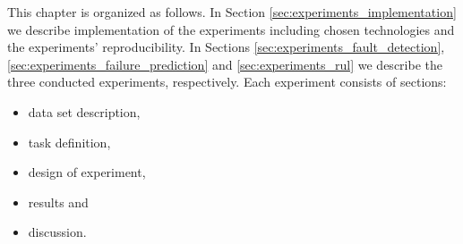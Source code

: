 This chapter is organized as follows.
In Section \ref{sec:experiments_implementation} we describe implementation of the experiments including chosen technologies and the experiments' reproducibility.
In Sections \ref{sec:experiments_fault_detection}, \ref{sec:experiments_failure_prediction} and \ref{sec:experiments_rul} we describe the three conducted experiments, respectively.
Each experiment consists of sections:
\begin{itemize}
    \item data set description,
    \item task definition,
    \item design of experiment,
    \item results and
    \item discussion.
\end{itemize}









